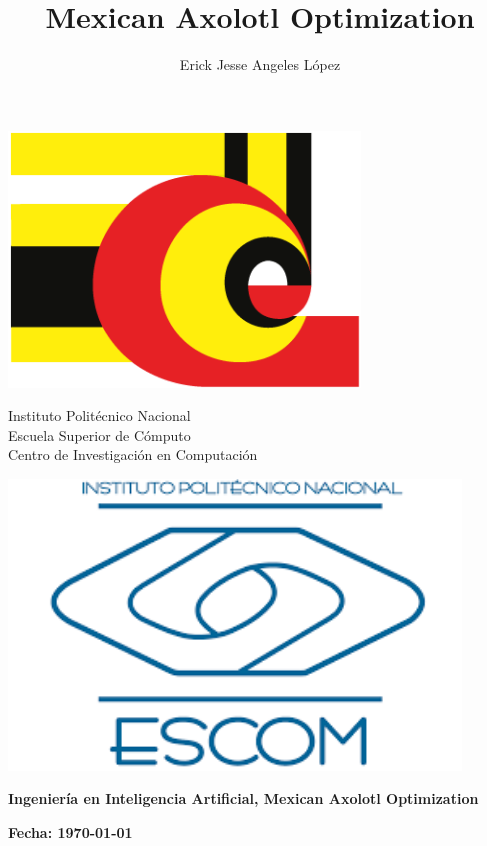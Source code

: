 \documentclass[12pt,twoside]{report}
\title{Mexican Axolotl Optimization}
\author{Erick Jesse Angeles López}
\date{}
\begin{document}
	
	\begin{center}
		
		\begin{minipage}{0.17\textwidth}
			\centering
			\includegraphics[width=0.7\textwidth]{img/cic_logo.png} %
		\end{minipage}
		\begin{minipage}{.55\textwidth}
			\centering
			{\Large Instituto Politécnico Nacional}\\
			{\Large Escuela Superior de Cómputo}\\
			{\Large Centro de Investigación en Computación}
		\end{minipage}
		\begin{minipage}{0.17\textwidth}
			\centering
			\includegraphics[width=0.9\textwidth]{img/escom_logo} %
		\end{minipage}			
	\end{center}
	
	
	\centerline{\bf Ingeniería en Inteligencia Artificial, Mexican Axolotl Optimization}
	
	\centerline{\bf Fecha: \today}
	
\end{document}
